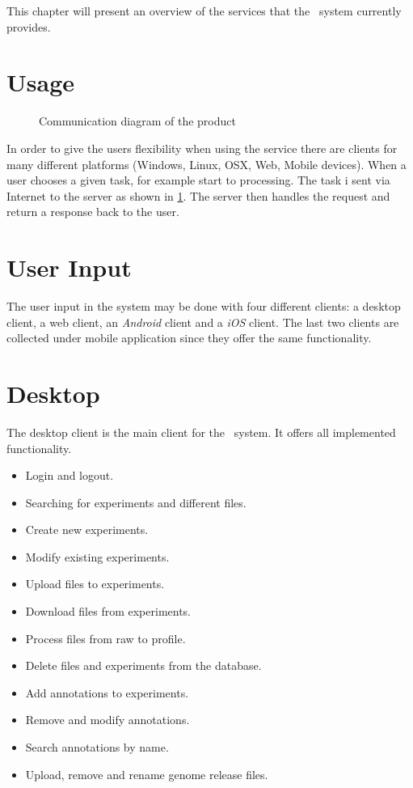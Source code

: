 


This chapter will present an overview of the services that the \appName\ system currently provides. 

\section{Usage}



\begin{figure}[h]
\caption{Communication diagram of the product}
\label{fig:con_serviceDescription}
\end{figure}
	
In order to give the users flexibility when using the service there are clients for many different platforms (Windows, Linux, OSX, Web, Mobile devices). 
When a user chooses a given task, for example start  to  processing. The task i sent via Internet to the server as shown in \ref{fig:con_serviceDescription}. The server then handles the request and return a response back to the user.

\section{User Input}
The user input in the \appName system may be done with four different clients: a desktop client, a web client, an \textit{Android} client and a \textit{iOS} client. The last two clients are collected under mobile application since they offer the same functionality.

\section{Desktop}
The desktop client is the main client for the \appName\ system. It offers all implemented functionality. 
\begin{itemize}
\item Login and logout.
\item Searching for experiments and different files.
\item Create new experiments.
\item Modify existing experiments.
\item Upload files to experiments.
\item Download files from experiments.
\item Process files from raw to profile.
\item Delete files and experiments from the database.
\item Add annotations to experiments.
\item Remove and modify annotations.
\item Search annotations by name.
\item Upload, remove and rename genome release files.
\end{itemize}

